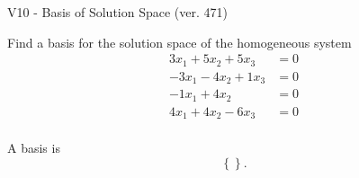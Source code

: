 \begin{exercise}
  \begin{exerciseTitle}V10 - Basis of Solution Space (ver. 471)\end{exerciseTitle}
  \begin{exerciseStatement}
    Find a basis for the solution space of the homogeneous system 
\begin{align*}
 3 x_ 1 + 5 x_ 2 + 5 x_ 3 &= 0  \\ 
  -3 x_ 1 -4 x_ 2 + 1 x_ 3 &= 0  \\ 
  -1 x_ 1 + 4 x_ 2 &= 0  \\ 
  4 x_ 1 + 4 x_ 2 -6 x_ 3 &= 0  \\ 
 \end{align*}


 
  \end{exerciseStatement}

  \begin{exerciseAnswer}
   A basis is   
\[\left\{\right\}.\]

  


  \end{exerciseAnswer}
\end{exercise}